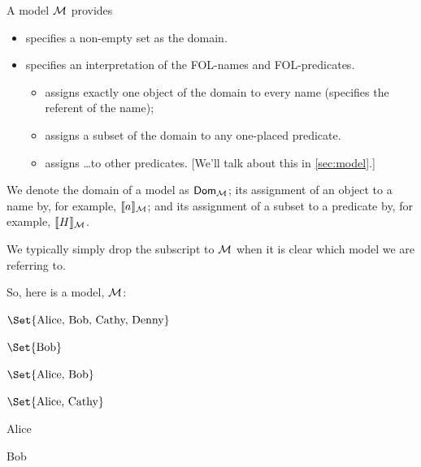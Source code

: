 A model ${\mathcal{M}}$ provides \begin{itemize}
	\item specifies a non-empty set as the domain.
	\item specifies an interpretation of the FOL-names and FOL-predicates. 
	\begin{itemize}
		\item assigns exactly one object of the domain to every name (specifies the referent of the name);
		\item assigns a subset of the domain to any one-placed predicate.
		\item assigns \ldots to other predicates. [We'll talk about this in \cref{sec:model}.]
	\end{itemize}
\end{itemize}
We denote the domain of a model as $\mathsf{Dom}_{\mathcal{M}}$; its assignment of an object to a name by, for example, $\llbracket a\rrbracket_{\mathcal{M}}$; and its assignment of a subset to a predicate by, for example, $\llbracket H\rrbracket_{\mathcal{M}}$. 

We typically simply drop the subscript to ${\mathcal{M}}$ when it is clear which model we are referring to.

So, here is a model, ${\mathcal{M}}$: \begin{interp}
	\item[\domain] $\Set{\text{Alice, Bob, Cathy, Denny}}$
	\item[\denote{H}] $\Set{\text{Bob}}$
	\item[\denote{S}] $\Set{\text{Alice, Bob}}$
	\item[\denote{C}] $\Set{\text{Alice, Cathy}}$
	\item[\denote{a}] {Alice}
	\item[\denote{b}] {Bob}
\end{interp}

